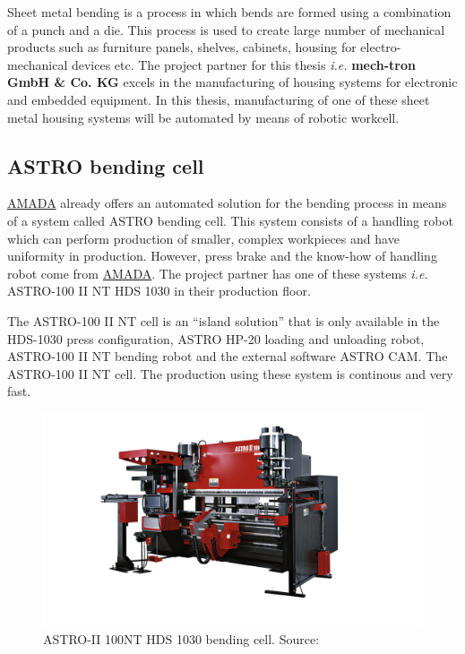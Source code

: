 Sheet metal bending is a process in which bends are formed using a combination of a punch and a die. This process is used to create large number of mechanical products such as furniture panels, shelves, cabinets, housing for electro-mechanical devices etc. \cite{alvaautomated}
The project partner for this thesis \textit{i.e.} \textbf{mech-tron GmbH \& Co. KG} excels in the manufacturing of housing systems for electronic and embedded equipment. In this thesis, manufacturing of one of these sheet metal housing systems will be automated by means of robotic workcell.

\subsection{ASTRO bending cell}
\label{subsec:astro}

\hyperref[acro:AMADA]{AMADA} already offers an automated solution for the bending process in means of a system called ASTRO bending cell. This system consists of a handling robot which can perform production of smaller, complex workpieces and have uniformity in production. However, press brake and the know-how of handling robot come from \hyperref[acro:AMADA]{AMADA}.
The project partner has one of these systems \textit{i.e.} ASTRO-100 II NT HDS 1030 in their production floor. 

The ASTRO-100 II NT cell is an “island solution” that is only available in the HDS-1030 press configuration, ASTRO HP-20 loading and unloading robot, ASTRO-100 II NT bending robot and the external software ASTRO CAM.
The ASTRO-100 II NT cell. \cite{astro100} The production using these system is continous and very fast.

\begin{figure}[h]
    \centering
    \includegraphics[width=\textwidth]{figures/ASTRO-100.jpg}
    \caption{ASTRO-II 100NT HDS 1030 bending cell. Source: \cite{astro100}}
    \label{fig:astro}
\end{figure}

